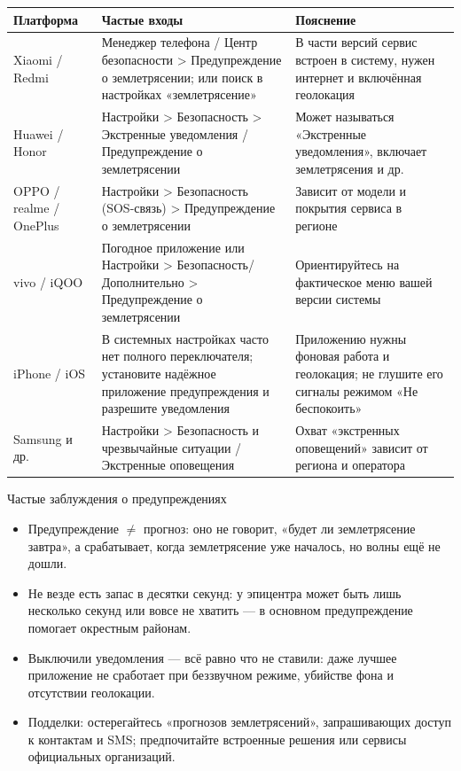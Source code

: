 \begin{center}
\begin{tabularx}{\linewidth}{|X|X|X|}
\hline
\textbf{Платформа} & \textbf{Частые входы} & \textbf{Пояснение} \tabularnewline
\hline
Xiaomi / Redmi & Менеджер телефона / Центр безопасности > Предупреждение о землетрясении; или поиск в настройках «землетрясение» & В части версий сервис встроен в систему, нужен интернет и включённая геолокация \tabularnewline
Huawei / Honor & Настройки > Безопасность > Экстренные уведомления / Предупреждение о землетрясении & Может называться «Экстренные уведомления», включает землетрясения и др. \tabularnewline
OPPO / realme / OnePlus & Настройки > Безопасность (SOS-связь) > Предупреждение о землетрясении & Зависит от модели и покрытия сервиса в регионе \tabularnewline
vivo / iQOO & Погодное приложение или Настройки > Безопасность/Дополнительно > Предупреждение о землетрясении & Ориентируйтесь на фактическое меню вашей версии системы \tabularnewline
iPhone / iOS & В системных настройках часто нет полного переключателя; установите надёжное приложение предупреждения и разрешите уведомления & Приложению нужны фоновая работа и геолокация; не глушите его сигналы режимом «Не беспокоить» \tabularnewline
Samsung и др. & Настройки > Безопасность и чрезвычайные ситуации / Экстренные оповещения & Охват «экстренных оповещений» зависит от региона и оператора \tabularnewline
\hline
\end{tabularx}
\end{center}

\begin{tcbwarn}{Частые заблуждения о предупреждениях}
\begin{itemize}
  \item Предупреждение $\neq$ прогноз: оно не говорит, «будет ли землетрясение завтра», а срабатывает, когда землетрясение уже началось, но волны ещё не дошли.
  \item Не везде есть запас в десятки секунд: у эпицентра может быть лишь несколько секунд или вовсе не хватить — в основном предупреждение помогает окрестным районам.
  \item Выключили уведомления — всё равно что не ставили: даже лучшее приложение не сработает при беззвучном режиме, убийстве фона и отсутствии геолокации.
  \item Подделки: остерегайтесь «прогнозов землетрясений», запрашивающих доступ к контактам и SMS; предпочитайте встроенные решения или сервисы официальных организаций.
\end{itemize}

\end{tcbwarn}

